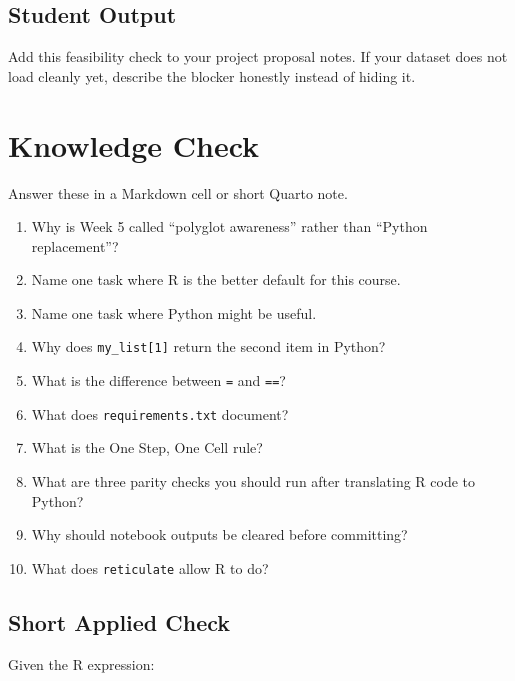 \documentclass[
  letterpaper,
  DIV=11,
  numbers=noendperiod,
  oneside]{scrreprt}
\newenvironment{Shaded}{\begin{snugshade}}{\end{snugshade}}
\newcommand{\AttributeTok}[1]{\textcolor[rgb]{0.40,0.45,0.13}{#1}}
\newcommand{\ConstantTok}[1]{\textcolor[rgb]{0.56,0.35,0.01}{#1}}
\newcommand{\FunctionTok}[1]{\textcolor[rgb]{0.28,0.35,0.67}{#1}}
\newcommand{\NormalTok}[1]{\textcolor[rgb]{0.00,0.23,0.31}{#1}}
\newcommand{\SpecialCharTok}[1]{\textcolor[rgb]{0.37,0.37,0.37}{#1}}
\providecommand{\tightlist}{%
  \setlength{\itemsep}{0pt}\setlength{\parskip}{0pt}}
\begin{document}
\section{Student Output}\label{student-output-2}

Add this feasibility check to your project proposal notes. If your
dataset does not load cleanly yet, describe the blocker honestly instead
of hiding it.

\chapter{Knowledge Check}\label{knowledge-check-3}

Answer these in a Markdown cell or short Quarto note.

\begin{enumerate}
\def\labelenumi{\arabic{enumi}.}
\tightlist
\item
  Why is Week 5 called ``polyglot awareness'' rather than ``Python
  replacement''?
\item
  Name one task where R is the better default for this course.
\item
  Name one task where Python might be useful.
\item
  Why does \texttt{my\_list{[}1{]}} return the second item in Python?
\item
  What is the difference between \texttt{=} and \texttt{==}?
\item
  What does \texttt{requirements.txt} document?
\item
  What is the One Step, One Cell rule?
\item
  What are three parity checks you should run after translating R code
  to Python?
\item
  Why should notebook outputs be cleared before committing?
\item
  What does \texttt{reticulate} allow R to do?
\end{enumerate}

\section{Short Applied Check}\label{short-applied-check}

Given the R expression:

\begin{Shaded}
\end{Shaded}
\end{document}
